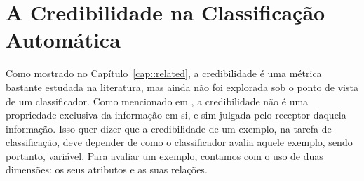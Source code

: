 \chapter{A Credibilidade na Classificação Automática} 
\label{cap::metodo}

Como mostrado no Capítulo~\ref{cap::related}, a credibilidade é uma métrica bastante estudada na literatura, mas ainda não foi explorada sob o ponto de vista de um classificador. Como mencionado em \cite{Sundar99}, a credibilidade não é uma propriedade exclusiva da informação em si, e sim julgada pelo receptor daquela informação. Isso quer dizer que a credibilidade de um exemplo, na tarefa de classificação, deve depender de como o classificador avalia aquele exemplo, sendo portanto, variável. 
Para avaliar um exemplo, contamos com o uso de duas dimensões: os seus atributos e as suas relações.


